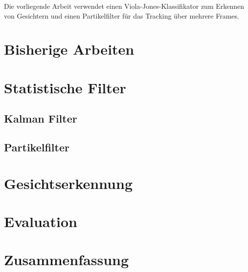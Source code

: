 \documentclass[a4paper, 11pt, twocolumn]{article}
\begin{document}
Die vorliegende Arbeit verwendet einen Viola-Jones-Klassifikator zum Erkennen von Gesichtern und einen Partikelfilter für das Tracking über mehrere Frames.


\section{Bisherige Arbeiten} %
\label{sec:bisherige_arbeiten}


\section{Statistische Filter} %
\label{sec:statistische_filter}


\subsection{Kalman Filter} %
\label{sub:kalman_filter}


\subsection{Partikelfilter} %
\label{sub:partikelfilter}


\section{Gesichtserkennung} %
\label{sec:gesichtserkennung}


\section{Evaluation} %
\label{sec:evaluation}


\section{Zusammenfassung} %
\label{sec:zusammenfassung}




\end{document}
